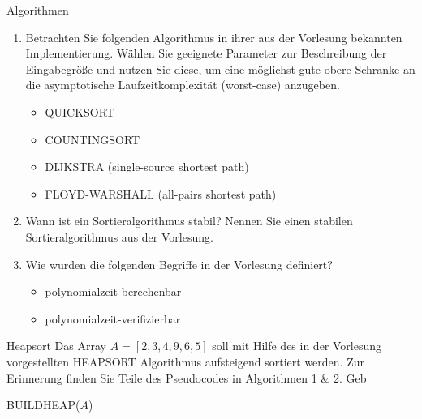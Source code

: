 \documentclass{article}
\begin{document}
\begin{exercise}{Algorithmen}
  \begin{enumerate}
    \item Betrachten Sie folgenden Algorithmus in ihrer aus der Vorlesung bekannten Implementierung. Wählen Sie geeignete Parameter zur Beschreibung der Eingabegröße und nutzen Sie diese, um eine möglichst gute obere Schranke an die asymptotische Laufzeitkomplexität (worst-case) anzugeben.
          \begin{itemize}
            \item QUICKSORT
            \item COUNTINGSORT
            \item DIJKSTRA (single-source shortest path)
            \item FLOYD-WARSHALL (all-pairs shortest path)
          \end{itemize}
    \item Wann ist ein Sortieralgorithmus stabil? Nennen Sie einen stabilen Sortieralgorithmus aus der Vorlesung.
    \item Wie wurden die folgenden Begriffe in der Vorlesung definiert?
          \begin{itemize}
            \item polynomialzeit-berechenbar
            \item polynomialzeit-verifizierbar
          \end{itemize}
  \end{enumerate}
\end{exercise}

\begin{exercise}{Heapsort}
  Das Array $A = [2,3,4,9,6,5]$ soll mit Hilfe des in der Vorlesung vorgestellten HEAPSORT Algorithmus aufsteigend sortiert werden. Zur Erinnerung finden Sie Teile des Pseudocodes in Algorithmen 1 \& 2. Geb
  \begin{algorithm}[ht]
    \caption{HEAPSORT($A$)}
    BUILDHEAP($A$) \\
  \end{algorithm}
\end{exercise}
\end{document}
